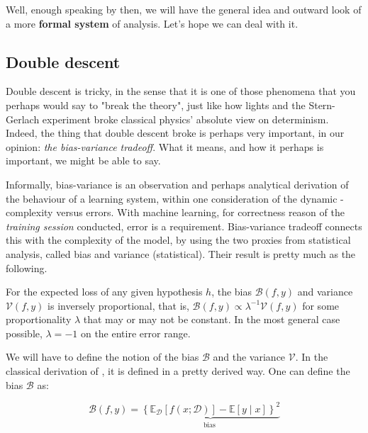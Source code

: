 Well, enough speaking by then, we will have the general idea and outward look of a more \textbf{formal system} of analysis. Let's hope we can deal with it. 

\subsection{Double descent} 

Double descent is tricky, in the sense that it is one of those phenomena that you perhaps would say to "break the theory", just like how lights and the Stern-Gerlach experiment broke classical physics' absolute view on determinism. Indeed, the thing that double descent broke is perhaps very important, in our opinion: \textit{the bias-variance tradeoff}. What it means, and how it perhaps is important, we might be able to say. 

Informally, bias-variance is an observation and perhaps analytical derivation of the behaviour of a learning system, within one consideration of the dynamic - complexity versus errors. With machine learning, for correctness reason of the \textit{training session} conducted, error is a requirement. Bias-variance tradeoff connects this with the complexity of the model, by using the two proxies from statistical analysis, called bias and variance (statistical). Their result is pretty much as the following. 

\begin{theorem}
    For the expected loss of any given hypothesis $h$, the bias $\mathcal{B}(f,y)$ and variance $\mathcal{V}(f,y)$ is inversely proportional, that is, $\mathcal{B}(f,y)\propto \lambda^{-1} \mathcal{V}(f,y)$ for some proportionality $\lambda$ that may or may not be constant. In the most general case possible, $\lambda = -1$ on the entire error range. 
\end{theorem}

We will have to define the notion of the bias $\mathcal{B}$ and the variance $\mathcal{V}$. In the classical derivation of \cite{6797087}, it is defined in a pretty derived way. One can define the bias $\mathcal{B}$ as: 

\begin{equation}
    \mathcal{B}(f,y) = \underbrace{\left\{ \mathbb{E}_{\mathcal{D}}[f(x;\mathcal{D})] - \mathbb{E}[y\mid x] \right\}^{2}}_{\text{bias }}
\end{equation}

